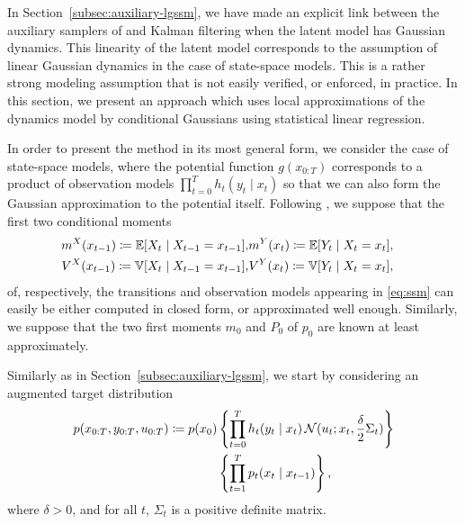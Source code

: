 In Section~\ref{subsec:auxiliary-lgssm}, we have made an explicit link between the auxiliary samplers of \citet{titsias2018} and Kalman filtering when the latent model has Gaussian dynamics. This linearity of the latent model corresponds to the assumption of linear Gaussian dynamics in the case of state-space models. This is a rather strong modeling assumption that is not easily verified, or enforced, in practice. In this section, we present an approach which uses local approximations of the dynamics model by conditional Gaussians using statistical linear regression.

In order to present the method in its most general form, we consider the case of state-space models, where the potential function $g(x_{0:T})$ corresponds to a product of observation models $\prod_{t=0}^T h_t(y_t \mid x_t)$ so that we can also form the Gaussian approximation to the potential itself. Following \citet{Tronarp2018iterative}, we suppose that the first two conditional moments
\begin{align}
    \label{eq:conditional-moments}
    \begin{split}
        m^X(x_{t-1}) \coloneqq \mathbb{E}[X_t \mid X_{t-1} = x_{t-1}],\\
        V^X(x_{t-1}) \coloneqq \mathbb{V}[X_t \mid X_{t-1} = x_{t-1}],
    \end{split}
    &
    \begin{split}
        m^Y(x_{t}) \coloneqq \mathbb{E}[Y_t \mid X_{t} = x_t],\\
        V^Y(x_{t}) \coloneqq \mathbb{V}[Y_t \mid X_{t} = x_{t}],
    \end{split}
\end{align}
of, respectively, the transitions and observation models appearing in \eqref{eq:ssm} can easily be either computed in closed form, or approximated well enough. Similarly, we suppose that the two first moments $m_0$ and $P_0$ of $p_0$ are known at least approximately.

Similarly as in Section~\ref{subsec:auxiliary-lgssm}, we start by considering an augmented target distribution
\begin{equation}
    \label{eq:augmented-ssm}
    \begin{split}
        p(x_{0:T}, y_{0:T}, u_{0:T})
        \coloneqq p(x_0)
        &\left\{\prod_{t=0}^T h_t(y_t \mid x_t) \,\mathcal{N}(u_t; x_t, \frac{\delta}{2}\Sigma_t)  \right\} \\
        &\left\{\prod_{t=1}^T p_t(x_t \mid x_{t-1}) \right\},
    \end{split}
\end{equation}
where $\delta > 0$, and for all $t$, $\Sigma_t$ is a positive definite matrix.

